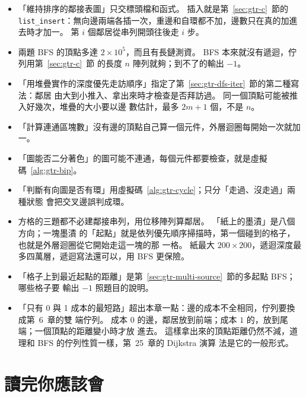\begin{itemize}
\item 「維持排序的鄰接表圖」只交標頭檔和函式。 插入就是第~\ref{sec:gtr-c}~節的
\texttt{list\_insert}：無向邊兩端各插一次，重邊和自環都不加，邊數只在真的加進去時才加一。
第 $i$ 個鄰居從串列開頭往後走 $i$ 步。
\item 兩題 BFS 的頂點多達 $2 \times 10^5$，而且有長鏈測資。 BFS 本來就沒有遞迴，佇列用第~\ref{sec:gtr-c}~節
的長度 $n$ 陣列就夠；到不了的輸出 $-1$。
\item 「用堆疊實作的深度優先走訪順序」指定了第~\ref{sec:gtr-dfs-iter}~節的第二種寫法：鄰居
由大到小推入、拿出來時才檢查是否拜訪過。 同一個頂點可能被推入好幾次，堆疊的大小要以邊
數估計，最多 $2m + 1$ 個，不是 $n$。
\item 「計算連通區塊數」沒有邊的頂點自己算一個元件，外層迴圈每開始一次就加一。
\item 「圖能否二分著色」的圖可能不連通，每個元件都要檢查，就是虛擬碼~\ref{alg:gtr-bip}。
\item 「判斷有向圖是否有環」用虛擬碼~\ref{alg:gtr-cycle}；只分「走過、沒走過」兩種狀態
會把交叉邊誤判成環。
\item 方格的三題都不必建鄰接串列，用位移陣列算鄰居。 「紙上的墨漬」是八個方向；一塊墨漬
的「起點」就是依列優先順序掃描時，第一個碰到的格子，也就是外層迴圈從它開始走這一塊的那
一格。 紙最大 $200 \times 200$，遞迴深度最多四萬層，遞迴寫法還可以，用 BFS 更保險。
\item 「格子上到最近起點的距離」是第~\ref{sec:gtr-multi-source}~節的多起點 BFS；哪些格子要
輸出 $-1$ 照題目的說明。
\item 「只有 0 與 1 成本的最短路」超出本章一點：邊的成本不全相同，佇列要換成第~6~章的雙
端佇列。 成本 $0$ 的邊，鄰居放到前端；成本 $1$ 的，放到尾端；一個頂點的距離變小時才放
進去。 這樣拿出來的頂點距離仍然不減，道理和 BFS 的佇列性質一樣，第~25~章的 Dijkstra 演算
法是它的一般形式。
\end{itemize}

\section{讀完你應該會}
\label{sec:gtr-checklist}

